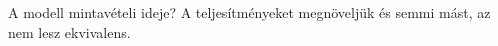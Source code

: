A modell mintavételi ideje?
A teljesítményeket megnöveljük és semmi mást, az nem lesz ekvivalens. 








%
%
%



